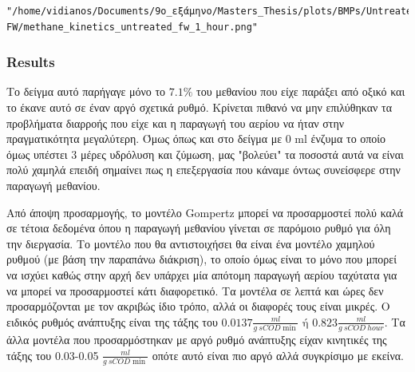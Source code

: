 \documentclass[11pt]{article}
\begin{document}
\begin{verbatim}
"/home/vidianos/Documents/9o_εξάμηνο/Masters_Thesis/plots/BMPs/Untreated FW/methane_kinetics_untreated_fw_1_hour.png"
\end{verbatim}

\subsubsection{Results}
\label{sec:orgc2f7152}
Το δείγμα αυτό παρήγαγε μόνο το \(7.1 \%\) του μεθανίου που είχε παράξει από οξικό και το έκανε αυτό σε έναν αργό σχετικά ρυθμό. Κρίνεται πιθανό να μην επιλύθηκαν τα προβλήματα διαρροής που είχε και η παραγωγή του αερίου να ήταν στην πραγματικότητα μεγαλύτερη. Όμως όπως και στο δείγμα με 0 ml ένζυμα το οποίο όμως υπέστει 3 μέρες υδρόλυση και ζύμωση, μας "βολεύει" τα ποσοστά αυτά να είναι πολύ χαμηλά επειδή σημαίνει πως η επεξεργασία που κάναμε όντως συνείσφερε στην παραγωγή μεθανίου.

Από άποψη προσαρμογής, το μοντέλο Gompertz μπορεί να προσαρμοστεί πολύ καλά σε τέτοια δεδομένα όπου η παραγωγή μεθανίου γίνεται σε παρόμοιο ρυθμό για όλη την διεργασία. Το μοντέλο που θα αντιστοιχήσει θα είναι ένα μοντέλο χαμηλού ρυθμού (με βάση την παραπάνω διάκριση), το οποίο όμως είναι το μόνο που μπορεί να ισχύει καθώς στην αρχή δεν υπάρχει μία απότομη παραγωγή αερίου ταχύτατα για να μπορεί να προσαρμοστεί κάτι διαφορετικό. Τα μοντέλα σε λεπτά και ώρες δεν προσαρμόζονται με τον ακριβώς ίδιο τρόπο, αλλά οι διαφορές τους είναι μικρές. Ο ειδικός ρυθμός ανάπτυξης είναι της τάξης του \(0.0137 \frac{ml}{g ~ sCOD \min} \text{ ή } 0.823 \frac{ml}{g ~ sCOD ~ hour}\). Τα άλλα μοντέλα που προσαρμόστηκαν με αργό ρυθμό ανάπτυξης είχαν κινητικές της τάξης του 0.03-0.05 \(\frac{ml}{g ~ sCOD \min }\) οπότε αυτό είναι πιο αργό αλλά συγκρίσιμο με εκείνα.
\end{document}
